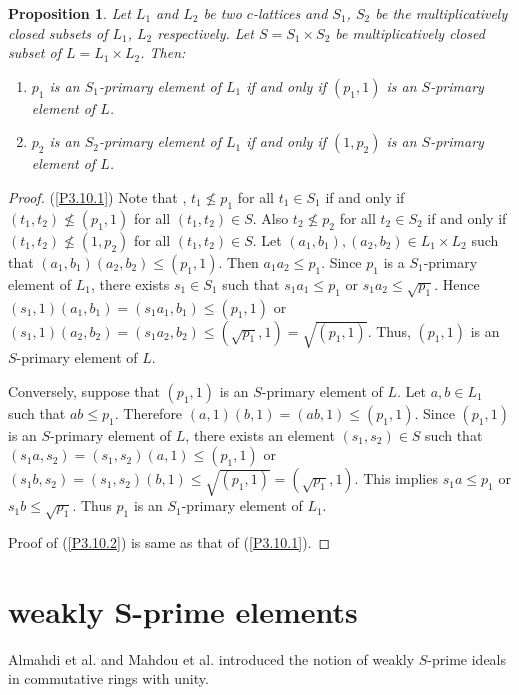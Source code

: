 \documentclass[10pt,twoside,a4paper]{amsart}
\numberwithin{equation}{section}
\theoremstyle{plain}
\newtheorem{prop}[lem]{Proposition}
\theoremstyle{definition}
\begin{document}
\begin{prop}%
	Let $L_1$ and $L_2$ be two $c$-lattices and $S_1$, $S_2$ be the multiplicatively closed subsets of $L_1$, $L_2$ respectively. Let $S=S_1\times S_2$ be multiplicatively closed subset of  $L=L_1\times L_2$. Then:
	\begin{enumerate}
		\item\label{P3.10.1} $p_1$ is an $S_1$-primary element of $L_1$ if and only if $(p_1,1)$ is an $S$-primary element of $L$.
		\item\label{P3.10.2} $p_2$ is an $S_2$-primary element of $L_1$ if and only if $(1,p_2)$ is an $S$-primary element of $L$.
	\end{enumerate}
\end{prop}    
\begin{proof} 
	(\ref{P3.10.1})	Note that , $t_1\nleq p_1$ for all $t_1\in S_1$ if and only if $(t_1,t_2)\nleq (p_1,1)$ for all $(t_1,t_2) \in S$. Also $t_2 \nleq p_2$ for all $t_2 \in S_2$ if and only if $(t_1,t_2) \nleq (1,p_2)$ for all $(t_1,t_2) \in S$. Let $(a_1,b_1), (a_2,b_2)\in L_1\times L_2$ such that $(a_1,b_1)(a_2,b_2)\leq (p_1,1)$. Then $a_1a_2\leq p_1$. Since $p_1$ is a $S_1$-primary element of $L_1$, there exists $s_1\in S_1$ such that $s_1a_1\leq p_1$ or $s_1a_2\leq \sqrt{p_1}$. Hence $(s_1,1)(a_1,b_1)=(s_1a_1,b_1)\leq (p_1,1)$ or $(s_1,1)(a_2,b_2)=(s_1a_2,b_2)\leq (\sqrt{p_1},1)=\sqrt{(p_1,1)}$. Thus, $(p_1,1)$ is an $S$-primary element of $L$.
	
	Conversely, suppose that $(p_1,1)$ is an $S$-primary element of $L$. Let $a,b\in L_1$ such that $ab\leq p_1$. Therefore $(a,1)(b,1)=(ab,1)\leq (p_1,1)$. Since $(p_1,1)$ is an $S$-primary element of $L$, there exists an element $(s_1,s_2)\in S$ such that $(s_1a,s_2)=(s_1,s_2)(a,1)\leq (p_1,1)$ or $(s_1b,s_2)=(s_1,s_2)(b,1)\leq \sqrt{(p_1,1)}=(\sqrt{p_1},1)$. This implies $s_1a\leq p_1$ or $s_1b\leq \sqrt{p_1}$. Thus $p_1$ is an $S_1$-primary element of $L_1$.
	
	Proof of 	(\ref{P3.10.2}) is same as that of  (\ref{P3.10.1}).
\end{proof}	



\section{weakly S-prime elements}
Almahdi et al. \cite{ABT} and Mahdou et al. \cite{MMZ} introduced the notion of weakly $S$-prime ideals in commutative rings with unity.
\end{document}
